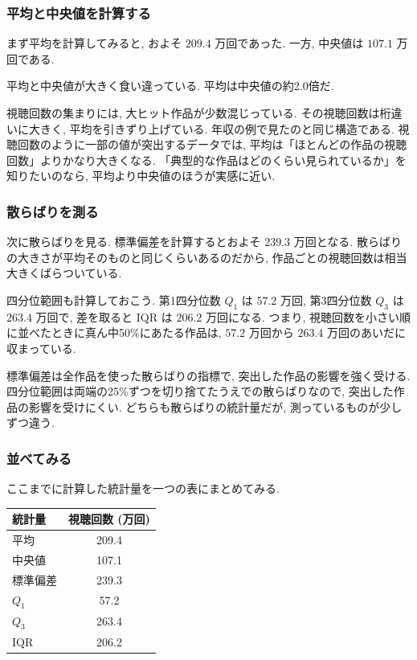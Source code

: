     \subsubsection*{平均と中央値を計算する}

    まず平均を計算してみると, およそ $209.4$ 万回であった.
    一方, 中央値は $107.1$ 万回である.

    平均と中央値が大きく食い違っている.
    平均は中央値の約2.0倍だ.

    視聴回数の集まりには, 大ヒット作品が少数混じっている.
    その視聴回数は桁違いに大きく, 平均を引きずり上げている.
    年収の例で見たのと同じ構造である.
    視聴回数のように一部の値が突出するデータでは, 平均は「ほとんどの作品の視聴回数」よりかなり大きくなる.
    「典型的な作品はどのくらい見られているか」を知りたいのなら, 平均より中央値のほうが実感に近い.

    \subsubsection*{散らばりを測る}

    次に散らばりを見る.
    標準偏差を計算するとおよそ $239.3$ 万回となる.
    散らばりの大きさが平均そのものと同じくらいあるのだから, 作品ごとの視聴回数は相当大きくばらついている.

    四分位範囲も計算しておこう.
    第1四分位数 $Q_1$ は $57.2$ 万回, 第3四分位数 $Q_3$ は $263.4$ 万回で, 差を取ると $\mathrm{IQR}$ は $206.2$ 万回になる.
    つまり, 視聴回数を小さい順に並べたときに真ん中50\%にあたる作品は, $57.2$ 万回から $263.4$ 万回のあいだに収まっている.

    標準偏差は全作品を使った散らばりの指標で, 突出した作品の影響を強く受ける.
    四分位範囲は両端の25\%ずつを切り捨てたうえでの散らばりなので, 突出した作品の影響を受けにくい.
    どちらも散らばりの統計量だが, 測っているものが少しずつ違う.

    \subsubsection*{並べてみる}

    ここまでに計算した統計量を一つの表にまとめてみる.

    \begin{center}
      \begin{tabular}{l|c}
        統計量 & 視聴回数 (万回) \\ \hline
        平均 & 209.4 \\
        中央値 & 107.1 \\
        標準偏差 & 239.3 \\
        $Q_1$ & 57.2 \\
        $Q_3$ & 263.4 \\
        $\mathrm{IQR}$ & 206.2 \\
      \end{tabular}
    \end{center}

